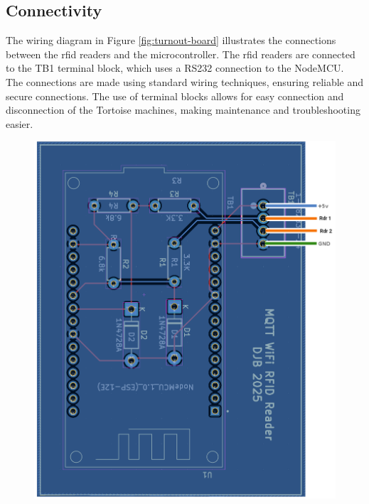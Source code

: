 \subsection{Connectivity}
The wiring diagram in Figure \ref{fig:turnout-board} illustrates the connections between the \gls{rfid} readers and the microcontroller. The \gls{rfid} readers are connected to the TB1 terminal block, which uses a RS232 connection to the NodeMCU.
The connections are made using standard wiring techniques, ensuring reliable and secure connections. The use of terminal blocks allows for easy connection and disconnection of the Tortoise machines, making maintenance and troubleshooting easier.
\begin{figure}[H]
  \centering
    \includegraphics[scale=0.2]{board1.png}\hfill

\end{figure}
